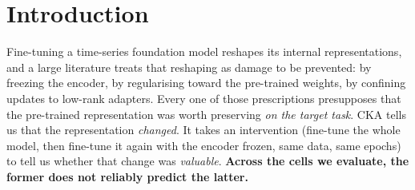 \section{Introduction}
\label{sec:intro}


Fine-tuning a time-series foundation model reshapes its internal
representations, and a large literature treats that reshaping as damage to be
prevented: by freezing the encoder, by regularising toward the pre-trained
weights, by confining updates to low-rank adapters.  Every one of those
prescriptions presupposes that the pre-trained representation was worth
preserving \emph{on the target task}.  CKA tells us that the representation \emph{changed}.  It
takes an intervention (fine-tune the whole model, then fine-tune it again with
the encoder frozen, same data, same epochs) to tell us whether that change was
\emph{valuable}.  \textbf{Across the cells we evaluate, the former does not
reliably predict the latter.}

